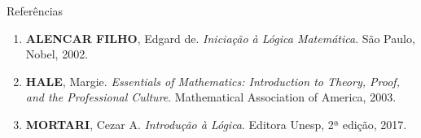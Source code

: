 \begin{frame}[fragile]{Referências}

    \begin{enumerate}
        \item \textbf{ALENCAR FILHO}, Edgard de. \textit{Iniciação à Lógica Matemática}. São Paulo, Nobel, 2002.

        \item \textbf{HALE}, Margie. \textit{Essentials of Mathematics: Introduction to Theory, Proof, and the Professional Culture}. Mathematical Association of America, 2003.

        \item \textbf{MORTARI}, Cezar A. \textit{Introdução à Lógica}. Editora Unesp, 2ª edição, 2017.
    \end{enumerate}

\end{frame}
